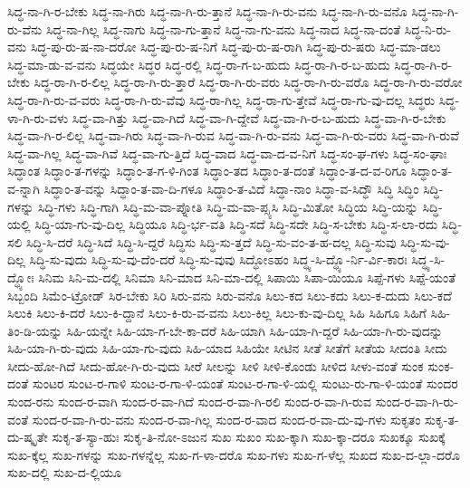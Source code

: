 {ಸಿದ್ಧ-ನಾ-ಗಿ-ರ-ಬೇಕು
ಸಿದ್ಧ-ನಾ-ಗಿರು
ಸಿದ್ಧ-ನಾ-ಗಿ-ರು-ತ್ತಾನೆ
ಸಿದ್ಧ-ನಾ-ಗಿ-ರು-ವನು
ಸಿದ್ಧ-ನಾ-ಗಿ-ರು-ವನೊ
ಸಿದ್ಧ-ನಾ-ಗಿ-ರು-ವೆನು
ಸಿದ್ಧ-ನಾ-ಗಿಲ್ಲ
ಸಿದ್ಧ-ನಾಗು
ಸಿದ್ಧ-ನಾ-ಗು-ತ್ತಾನೆ
ಸಿದ್ಧ-ನಾ-ಗು-ವನು
ಸಿದ್ಧ-ನಾದ
ಸಿದ್ಧ-ನಾ-ದಂತೆ
ಸಿದ್ಧ-ನಿ-ರು-ವನು
ಸಿದ್ಧ-ಪು-ರು-ಷ-ನಾ-ದರೋ
ಸಿದ್ಧ-ಪು-ರು-ಷ-ನಿಗೆ
ಸಿದ್ಧ-ಪು-ರು-ಷ-ರಾಗಿ
ಸಿದ್ಧ-ಪು-ರು-ಷರು
ಸಿದ್ಧ-ಮಾ-ಡಲು
ಸಿದ್ಧ-ಮಾ-ಡು-ವ-ವನು
ಸಿದ್ಧಯೇ
ಸಿದ್ಧರ
ಸಿದ್ಧ-ರಲ್ಲಿ
ಸಿದ್ಧ-ರಾ-ಗ-ಬ-ಹುದು
ಸಿದ್ಧ-ರಾ-ಗಿ-ರ-ಬ-ಹುದು
ಸಿದ್ಧ-ರಾ-ಗಿ-ರ-ಬೇಕು
ಸಿದ್ಧ-ರಾ-ಗಿ-ರ-ಲಿಲ್ಲ
ಸಿದ್ಧ-ರಾ-ಗಿ-ರು-ತ್ತಾರೆ
ಸಿದ್ಧ-ರಾ-ಗಿ-ರು-ವರು
ಸಿದ್ಧ-ರಾ-ಗಿ-ರು-ವರೊ
ಸಿದ್ಧ-ರಾ-ಗಿ-ರು-ವರೋ
ಸಿದ್ಧ-ರಾ-ಗಿ-ರು-ವ-ವರು
ಸಿದ್ಧ-ರಾ-ಗಿ-ರು-ವೆವು
ಸಿದ್ಧ-ರಾ-ಗಿಲ್ಲ
ಸಿದ್ಧ-ರಾ-ಗು-ತ್ತೇವೆ
ಸಿದ್ಧ-ರಾ-ಗು-ವು-ದಲ್ಲ
ಸಿದ್ಧರು
ಸಿದ್ಧ-ಳಾ-ಗಿ-ರು-ವಳು
ಸಿದ್ಧ-ವಾ-ಗಿತ್ತು
ಸಿದ್ಧ-ವಾ-ಗಿದೆ
ಸಿದ್ಧ-ವಾ-ಗಿ-ದ್ದೇವೆ
ಸಿದ್ಧ-ವಾ-ಗಿ-ರ-ಬ-ಹುದು
ಸಿದ್ಧ-ವಾ-ಗಿ-ರ-ಬೇಕು
ಸಿದ್ಧ-ವಾ-ಗಿ-ರ-ಲಿಲ್ಲ
ಸಿದ್ಧ-ವಾ-ಗಿರು
ಸಿದ್ಧ-ವಾ-ಗಿ-ರುವ
ಸಿದ್ಧ-ವಾ-ಗಿ-ರು-ವನು
ಸಿದ್ಧ-ವಾ-ಗಿ-ರು-ವರು
ಸಿದ್ಧ-ವಾ-ಗಿ-ರುವೆ
ಸಿದ್ಧ-ವಾ-ಗಿಲ್ಲ
ಸಿದ್ಧ-ವಾ-ಗಿವೆ
ಸಿದ್ಧ-ವಾ-ಗು-ತ್ತಿದೆ
ಸಿದ್ಧ-ವಾದ
ಸಿದ್ಧ-ವಾ-ದ-ವ-ನಿಗೆ
ಸಿದ್ಧ-ಸಂ-ಘ-ಗಳು
ಸಿದ್ಧ-ಸಂ-ಘಾಃ
ಸಿದ್ಧಾಂತ
ಸಿದ್ಧಾಂ-ತ-ಗಳನ್ನು
ಸಿದ್ಧಾಂ-ತ-ಗ-ಳಿ-ಗಿಂತ
ಸಿದ್ಧಾಂ-ತದ
ಸಿದ್ಧಾಂ-ತ-ದಂತೆ
ಸಿದ್ಧಾಂ-ತ-ದ-ವ-ರಿಗೂ
ಸಿದ್ಧಾಂ-ತ-ವ-ನ್ನಾಗಿ
ಸಿದ್ಧಾಂ-ತ-ವನ್ನು
ಸಿದ್ಧಾಂ-ತ-ವಾ-ದಿ-ಗಳೂ
ಸಿದ್ಧಾಂ-ತ-ವಿದೆ
ಸಿದ್ಧಾ-ನಾಂ
ಸಿದ್ಧಾ-ವ-ಸಿದ್ಧೌ
ಸಿದ್ಧಿ
ಸಿದ್ಧಿಂ
ಸಿದ್ಧಿ-ಗಳನ್ನು
ಸಿದ್ಧಿ-ಗಳು
ಸಿದ್ಧಿ-ಗಾಗಿ
ಸಿದ್ಧಿ-ಮ-ವಾ-ಪ್ನೋತಿ
ಸಿದ್ಧಿ-ಮ-ವಾ-ಪ್ಸ್ಯಸಿ
ಸಿದ್ಧಿ-ಮಿತೋ
ಸಿದ್ಧಿಯ
ಸಿದ್ಧಿ-ಯನ್ನು
ಸಿದ್ಧಿ-ಯಲ್ಲಿ
ಸಿದ್ಧಿ-ಯಾ-ಗು-ವು-ದಿಲ್ಲ
ಸಿದ್ಧಿಯೂ
ಸಿದ್ಧಿ-ರ್ಭ-ವತಿ
ಸಿದ್ಧಿ-ಸದೆ
ಸಿದ್ಧಿ-ಸದೇ
ಸಿದ್ಧಿ-ಸ-ಬೇಕು
ಸಿದ್ಧಿ-ಸ-ಲಾ-ರದು
ಸಿದ್ಧಿ-ಸಲಿ
ಸಿದ್ಧಿ-ಸಿ-ದರೆ
ಸಿದ್ಧಿ-ಸಿದೆ
ಸಿದ್ಧಿ-ಸಿ-ದ್ದರೆ
ಸಿದ್ಧಿಸು
ಸಿದ್ಧಿ-ಸು-ತ್ತದೆ
ಸಿದ್ಧಿ-ಸು-ವಂ-ತ-ಹ-ದಲ್ಲ
ಸಿದ್ಧಿ-ಸುವು
ಸಿದ್ಧಿ-ಸು-ವು-ದಿಲ್ಲ
ಸಿದ್ಧಿ-ಸು-ವುದು
ಸಿದ್ಧಿ-ಸು-ವು-ದೆಂ-ದರೆ
ಸಿದ್ಧಿ-ಸು-ವುವು
ಸಿದ್ಧೋಽಹಂ
ಸಿದ್ಧ್ಯ-ಸಿ-ದ್ಧ್ಯೊ-ರ್ನಿ-ರ್ವಿ-ಕಾರಃ
ಸಿದ್ಧ್ಯ-ಸಿ-ದ್ಧ್ಯೋಃ
ಸಿನಿಮ
ಸಿನಿ-ಮ-ದಲ್ಲಿ
ಸಿನಿಮಾ
ಸಿನಿ-ಮಾದ
ಸಿನಿ-ಮಾ-ದಲ್ಲಿ
ಸಿಪಾಯಿ
ಸಿಪಾ-ಯಿಯೂ
ಸಿಪ್ಪೆ-ಗಳು
ಸಿಪ್ಪೆ-ಯಂತೆ
ಸಿಬ್ಬಂದಿ
ಸಿಮೆಂ-ಟ್ರೋಡ್
ಸಿರ-ಬೇಕು
ಸಿರಿ
ಸಿರು-ವನು
ಸಿರು-ವನೊ
ಸಿಲು-ಕದ
ಸಿಲು-ಕದು
ಸಿಲು-ಕ-ದುದು
ಸಿಲು-ಕದೆ
ಸಿಲುಕಿ
ಸಿಲು-ಕಿ-ದರೆ
ಸಿಲು-ಕಿ-ದ್ದಾನೆ
ಸಿಲು-ಕಿ-ರು-ವ-ವನು
ಸಿಲು-ಕಿಲ್ಲ
ಸಿಲು-ಕು-ವು-ದಿಲ್ಲ
ಸಿಹಿ
ಸಿಹಿಗೂ
ಸಿಹಿಗೆ
ಸಿಹಿ-ತಿಂ-ಡಿ-ಯನ್ನು
ಸಿಹಿ-ಯನ್ನೇ
ಸಿಹಿ-ಯಾ-ಗ-ಬೇ-ಕಾ-ದರೆ
ಸಿಹಿ-ಯಾಗಿ
ಸಿಹಿ-ಯಾ-ಗಿ-ದ್ದರೆ
ಸಿಹಿ-ಯಾ-ಗಿ-ರು-ವುದನ್ನು
ಸಿಹಿ-ಯಾ-ಗಿ-ರು-ವುದು
ಸಿಹಿ-ಯಾ-ಗು-ವುದು
ಸಿಹಿ-ಯಾದ
ಸಿಹಿಯೇ
ಸೀಟಿನ
ಸೀತೆ
ಸೀತೆಗೆ
ಸೀತೆಯ
ಸೀದಂತಿ
ಸೀದು
ಸೀದು-ಹೋ-ಗಿದೆ
ಸೀದು-ಹೋ-ಗಿ-ರು-ವುದು
ಸೀರೆ
ಸೀಲನ್ನು
ಸೀಳಿ
ಸೀಳಿ-ಕೊಂಡು
ಸೀಳಿದ
ಸೀಳು-ವಂತೆ
ಸುಂಕ
ಸುಂಕ-ದಂತೆ
ಸುಂಟರ
ಸುಂಟ-ರ-ಗಾಳಿ
ಸುಂಟ-ರ-ಗಾ-ಳಿ-ಯಂತೆ
ಸುಂಟ-ರ-ಗಾ-ಳಿ-ಯಲ್ಲಿ
ಸುಂಟು-ರು-ಗಾ-ಳಿ-ಯಂತೆ
ಸುಂದರ
ಸುಂದ-ರನು
ಸುಂದ-ರ-ವಾಗಿ
ಸುಂದ-ರ-ವಾ-ಗಿದೆ
ಸುಂದ-ರ-ವಾ-ಗಿ-ರಲಿ
ಸುಂದ-ರ-ವಾ-ಗಿ-ರುವ
ಸುಂದ-ರ-ವಾ-ಗಿ-ರು-ವಂತೆ
ಸುಂದ-ರ-ವಾ-ಗಿ-ರು-ವನು
ಸುಂದ-ರ-ವಾ-ಗಿಲ್ಲ
ಸುಂದ-ರ-ವಾದ
ಸುಂದ-ರ-ವಾ-ದು-ವು-ಗಳು
ಸುಕೃತಂ
ಸುಕೃ-ತ-ದು-ಷ್ಕೃತೇ
ಸುಕೃ-ತ-ಸ್ಯಾ-ಹುಃ
ಸುಕೃ-ತಿ-ನೋ-ಽಜುನ
ಸುಖ
ಸುಖಂ
ಸುಖ-ಕ್ಕಾಗಿ
ಸುಖ-ಕ್ಕಾ-ದರೂ
ಸುಖಕ್ಕೂ
ಸುಖಕ್ಕೆ
ಸುಖ-ಕ್ಕೆಲ್ಲ
ಸುಖ-ಗಳನ್ನು
ಸುಖ-ಗಳನ್ನೆಲ್ಲ
ಸುಖ-ಗ-ಳಾ-ದರೊ
ಸುಖ-ಗಳು
ಸುಖ-ಗ-ಳೆಲ್ಲ
ಸುಖದ
ಸುಖ-ದ-ಲ್ಲಾ-ದರೊ
ಸುಖ-ದಲ್ಲಿ
ಸುಖ-ದ-ಲ್ಲಿಯೂ
}
